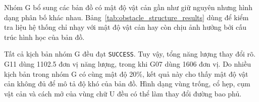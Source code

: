 \documentclass[../DoAn.tex]{subfiles}
\begin{document}
Nhóm G bổ sung các bản đồ có mật độ vật cản gần như giữ nguyên nhưng hình dạng phân bố khác nhau. Bảng~\ref{tab:obstacle_structure_results} dùng để kiểm tra liệu hệ thống chỉ nhạy với mật độ vật cản hay còn chịu ảnh hưởng bởi cấu trúc hình học của bản đồ.

\begin{table}[H]
\centering
\caption{Kết quả nhóm G theo cấu trúc phân bố vật cản}
\label{tab:obstacle_structure_results}
\scriptsize
\setlength{\tabcolsep}{3.5pt}
\renewcommand{\arraystretch}{1.08}
\end{table}

Tất cả kịch bản nhóm G đều đạt \texttt{SUCCESS}. Tuy vậy, tổng năng lượng thay đổi rõ. G11 dùng 1102.5 đơn vị năng lượng, trong khi G07 dùng 1606 đơn vị. Do nhiều kịch bản trong nhóm G có cùng mật độ 20\%, kết quả này cho thấy mật độ vật cản không đủ để mô tả độ khó của bản đồ. Hình dạng vùng trống, cổ hẹp, cụm vật cản và cách mở của vùng chữ U đều có thể làm thay đổi đường bao phủ.
\end{document}

